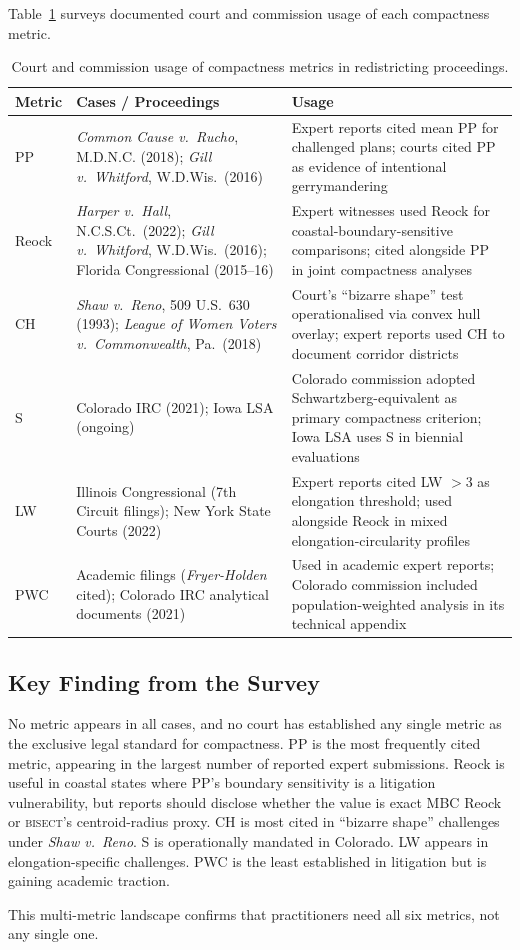 Table~\ref{tab:court_citations} surveys documented court and commission usage
of each compactness metric.

\begin{table}[ht]
\centering
\caption{Court and commission usage of compactness metrics in redistricting proceedings.}
\label{tab:court_citations}
\begin{tabular}{p{1.2cm}p{4.5cm}p{6.5cm}}
\toprule
Metric & Cases / Proceedings & Usage \\
\midrule
PP &
  \textit{Common Cause v.\ Rucho}, M.D.N.C. (2018);
  \textit{Gill v.\ Whitford}, W.D.Wis.\ (2016) &
  Expert reports cited mean PP for challenged plans; courts cited PP as
  evidence of intentional gerrymandering \\
\addlinespace
Reock &
  \textit{Harper v.\ Hall}, N.C.S.Ct.\ (2022);
  \textit{Gill v.\ Whitford}, W.D.Wis.\ (2016);
  Florida Congressional (2015--16) &
  Expert witnesses used Reock for coastal-boundary-sensitive comparisons;
  cited alongside PP in joint compactness analyses \\
\addlinespace
CH &
  \textit{Shaw v.\ Reno}, 509 U.S.\ 630 (1993);
  \textit{League of Women Voters v.\ Commonwealth}, Pa.\ (2018) &
  Court's ``bizarre shape'' test operationalised via convex hull overlay;
  expert reports used CH to document corridor districts \\
\addlinespace
S &
  Colorado IRC (2021);
  Iowa LSA (ongoing) &
  Colorado commission adopted Schwartzberg-equivalent as primary compactness
  criterion; Iowa LSA uses S in biennial evaluations \\
\addlinespace
LW &
  Illinois Congressional (7th Circuit filings);
  New York State Courts (2022) &
  Expert reports cited LW $> 3$ as elongation threshold; used alongside
  Reock in mixed elongation-circularity profiles \\
\addlinespace
PWC &
  Academic filings (\textit{Fryer-Holden} cited);
  Colorado IRC analytical documents (2021) &
  Used in academic expert reports; Colorado commission included
  population-weighted analysis in its technical appendix \\
\bottomrule
\end{tabular}
\end{table}

\subsection{Key Finding from the Survey}

No metric appears in all cases, and no court has established any single
metric as the exclusive legal standard for compactness.
PP is the most frequently cited metric, appearing in the largest number of
reported expert submissions.
Reock is useful in coastal states where PP's boundary sensitivity is a
litigation vulnerability, but reports should disclose whether the value is exact
MBC Reock or \textsc{bisect}'s centroid-radius proxy.
CH is most cited in ``bizarre shape'' challenges under \textit{Shaw v.\ Reno}.
S is operationally mandated in Colorado.
LW appears in elongation-specific challenges.
PWC is the least established in litigation but is gaining academic traction.

This multi-metric landscape confirms that practitioners need all six metrics,
not any single one.
